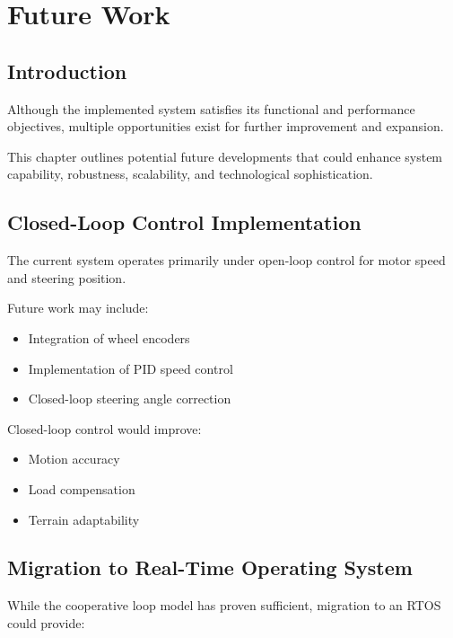 \chapter{Future Work}

\section{Introduction}

Although the implemented system satisfies its functional and performance objectives, 
multiple opportunities exist for further improvement and expansion.

This chapter outlines potential future developments that could enhance system capability, 
robustness, scalability, and technological sophistication.


\section{Closed-Loop Control Implementation}

The current system operates primarily under open-loop control for motor speed and steering position.

Future work may include:

\begin{itemize}
	\item Integration of wheel encoders
	\item Implementation of PID speed control
	\item Closed-loop steering angle correction
\end{itemize}

Closed-loop control would improve:

\begin{itemize}
	\item Motion accuracy
	\item Load compensation
	\item Terrain adaptability
\end{itemize}


\section{Migration to Real-Time Operating System}

While the cooperative loop model has proven sufficient, 
migration to an RTOS could provide:

